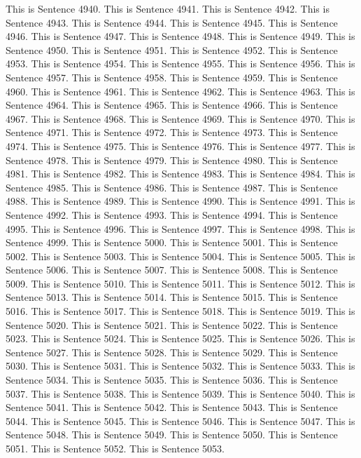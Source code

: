 \documentclass{article}
\begin{document}
This is Sentence 4940.
This is Sentence 4941.
This is Sentence 4942.
This is Sentence 4943.
This is Sentence 4944.
This is Sentence 4945.
This is Sentence 4946.
This is Sentence 4947.
This is Sentence 4948.
This is Sentence 4949.
This is Sentence 4950.
This is Sentence 4951.
This is Sentence 4952.
This is Sentence 4953.
This is Sentence 4954.
This is Sentence 4955.
This is Sentence 4956.
This is Sentence 4957.
This is Sentence 4958.
This is Sentence 4959.
This is Sentence 4960.
This is Sentence 4961.
This is Sentence 4962.
This is Sentence 4963.
This is Sentence 4964.
This is Sentence 4965.
This is Sentence 4966.
This is Sentence 4967.
This is Sentence 4968.
This is Sentence 4969.
This is Sentence 4970.
This is Sentence 4971.
This is Sentence 4972.
This is Sentence 4973.
This is Sentence 4974.
This is Sentence 4975.
This is Sentence 4976.
This is Sentence 4977.
This is Sentence 4978.
This is Sentence 4979.
This is Sentence 4980.
This is Sentence 4981.
This is Sentence 4982.
This is Sentence 4983.
This is Sentence 4984.
This is Sentence 4985.
This is Sentence 4986.
This is Sentence 4987.
This is Sentence 4988.
This is Sentence 4989.
This is Sentence 4990.
This is Sentence 4991.
This is Sentence 4992.
This is Sentence 4993.
This is Sentence 4994.
This is Sentence 4995.
This is Sentence 4996.
This is Sentence 4997.
This is Sentence 4998.
This is Sentence 4999.
This is Sentence 5000.
This is Sentence 5001.
This is Sentence 5002.
This is Sentence 5003.
This is Sentence 5004.
This is Sentence 5005.
This is Sentence 5006.
This is Sentence 5007.
This is Sentence 5008.
This is Sentence 5009.
This is Sentence 5010.
This is Sentence 5011.
This is Sentence 5012.
This is Sentence 5013.
This is Sentence 5014.
This is Sentence 5015.
This is Sentence 5016.
This is Sentence 5017.
This is Sentence 5018.
This is Sentence 5019.
This is Sentence 5020.
This is Sentence 5021.
This is Sentence 5022.
This is Sentence 5023.
This is Sentence 5024.
This is Sentence 5025.
This is Sentence 5026.
This is Sentence 5027.
This is Sentence 5028.
This is Sentence 5029.
This is Sentence 5030.
This is Sentence 5031.
This is Sentence 5032.
This is Sentence 5033.
This is Sentence 5034.
This is Sentence 5035.
This is Sentence 5036.
This is Sentence 5037.
This is Sentence 5038.
This is Sentence 5039.
This is Sentence 5040.
This is Sentence 5041.
This is Sentence 5042.
This is Sentence 5043.
This is Sentence 5044.
This is Sentence 5045.
This is Sentence 5046.
This is Sentence 5047.
This is Sentence 5048.
This is Sentence 5049.
This is Sentence 5050.
This is Sentence 5051.
This is Sentence 5052.
This is Sentence 5053.
\end{document}
